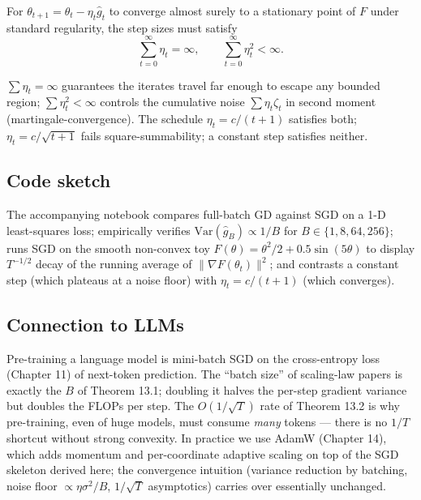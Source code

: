 \begin{proposition}
For $\theta_{t+1} = \theta_t - \eta_t \hat g_t$ to converge almost surely to a stationary point of $F$ under standard regularity, the step sizes must satisfy
\[
\sum_{t=0}^{\infty} \eta_t = \infty, \qquad \sum_{t=0}^{\infty} \eta_t^2 < \infty.
\]
\end{proposition}

\begin{remark}
$\sum \eta_t = \infty$ guarantees the iterates travel far enough to escape any bounded region; $\sum \eta_t^2 < \infty$ controls the cumulative noise $\sum \eta_t \zeta_t$ in second moment (martingale-convergence). The schedule $\eta_t = c/(t+1)$ satisfies both; $\eta_t = c/\sqrt{t+1}$ fails square-summability; a constant step satisfies neither.
\end{remark}

\subsection*{Code sketch}

The accompanying notebook compares full-batch GD against SGD on a 1-D least-squares loss; empirically verifies $\mathrm{Var}(\hat g_B) \propto 1/B$ for $B \in \{1, 8, 64, 256\}$; runs SGD on the smooth non-convex toy $F(\theta) = \theta^2/2 + 0.5\sin(5\theta)$ to display $T^{-1/2}$ decay of the running average of $\|\nabla F(\theta_t)\|^2$; and contrasts a constant step (which plateaus at a noise floor) with $\eta_t = c/(t+1)$ (which converges).

\subsection*{Connection to LLMs}

Pre-training a language model is mini-batch SGD on the cross-entropy loss (Chapter 11) of next-token prediction. The ``batch size'' of scaling-law papers is exactly the $B$ of Theorem 13.1; doubling it halves the per-step gradient variance but doubles the FLOPs per step. The $O(1/\sqrt{T})$ rate of Theorem 13.2 is why pre-training, even of huge models, must consume \emph{many} tokens --- there is no $1/T$ shortcut without strong convexity. In practice we use AdamW (Chapter 14), which adds momentum and per-coordinate adaptive scaling on top of the SGD skeleton derived here; the convergence intuition (variance reduction by batching, noise floor $\propto \eta \sigma^2/B$, $1/\sqrt{T}$ asymptotics) carries over essentially unchanged.
